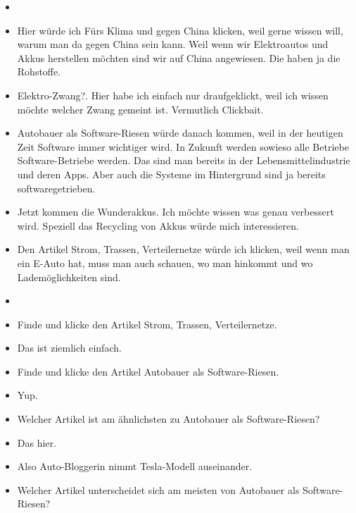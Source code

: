 {\begin{itemize}[]
            \item {}
            \item {} Hier würde ich \flqq Fürs Klima und gegen China\frqq{} klicken, weil gerne wissen will, warum man da gegen China sein kann.
                  Weil wenn wir Elektroautos und Akkus herstellen möchten sind wir auf China angewiesen.
                  Die haben ja die Rohstoffe.
            \item {} \flqq Elektro-Zwang?\frqq{}.
                  Hier habe ich einfach nur draufgeklickt, weil ich wissen möchte welcher Zwang gemeint ist.
                  Vermutlich Clickbait.
            \item {} \flqq Autobauer als Software-Riesen\frqq{} würde danach kommen, weil in der heutigen Zeit Software immer wichtiger wird.
                  In Zukunft werden sowieso alle Betriebe Software-Betriebe werden.
                  Das sind man bereits in der Lebensmittelindustrie und deren Apps.
                  Aber auch die Systeme im Hintergrund sind ja bereits softwaregetrieben.
            \item {} \flqq Jetzt kommen die Wunderakkus\frqq{}.
                  Ich möchte wissen was genau verbessert wird.
                  Speziell das Recycling von Akkus würde mich interessieren.
            \item {} Den Artikel \flqq Strom, Trassen, Verteilernetze\frqq{} würde ich klicken, weil wenn man ein E-Auto hat, muss man auch schauen, wo man hinkommt und wo Lademöglichkeiten sind.
            \item {}
            \item {} Finde und klicke den Artikel \flqq Strom, Trassen, Verteilernetze\frqq{}.
            \item {} Das ist ziemlich einfach.
            \item {} Finde und klicke den Artikel \flqq Autobauer als Software-Riesen\frqq{}.
            \item {} Yup.
            \item {} Welcher Artikel ist am ähnlichsten zu \flqq Autobauer als Software-Riesen\frqq{}?
            \item {} Das hier.
            \item {} Also \flqq Auto-Bloggerin nimmt Tesla-Modell auseinander\frqq{}.
            \item {} Welcher Artikel unterscheidet sich am meisten von \flqq Autobauer als Software-Riesen\frqq{}?

\end{itemize}}
